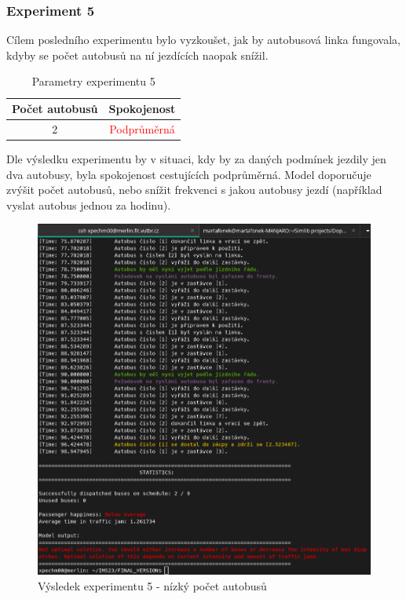 \documentclass[a4paper]{article}
\begin{document}
            \newpage
            \subsubsection{Experiment 5}
            \label{subsubsec:experiment5}

                Cílem posledního experimentu bylo vyzkoušet, jak by autobusová linka fungovala, kdyby se počet autobusů na ní jezdících naopak snížil.
    
                \begin{table}[H]
                    \centering
                    \begin{tabular}{ | c | c |}
                        \hline
                        Počet autobusů & Spokojenost\\
                        \hline
                        \hline
                        2 & \textcolor{red}{Podprůměrná} \\
                        \hline
                    \end{tabular}
                    \caption{Parametry experimentu 5}
                    \label{tab:experiment5}
                \end{table}

            Dle výsledku experimentu by v situaci, kdy by za daných podmínek jezdily jen dva autobusy, byla spokojenost cestujících podprůměrná. Model doporučuje zvýšit počet autobusů, nebo snížit frekvenci s jakou autobusy jezdí (například vyslat autobus jednou za hodinu).
                
                \begin{figure}[H]
                \includegraphics[scale=0.37, keepaspectratio]{fig/ims_bus5.png}
                \caption{Výsledek experimentu 5 - nízký počet autobusů}
                \label{fig:experiment5}
            \end{figure}
\end{document}
